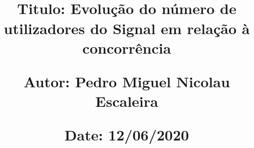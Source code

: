 \documentclass{article}
\begin{document}
\title{\vspace{-0.9cm}
       \large\raggedright\textbf{} \\ 
       \vspace{0.5cm}
       \normalsize
       \raggedright\textbf{Titulo: \hspace{1.1cm} Evolução do número de utilizadores do Signal em relação à concorrência} \\ \vspace{0.4cm}
       \raggedright\textbf{Autor: \hspace{1.13cm} Pedro Miguel Nicolau Escaleira} \\ \vspace{0.4cm}
       \raggedright\textbf{Date: \hspace{1.3cm} 12/06/2020} \\}
\author{}
\date{}

\maketitle
\thispagestyle{fancy}

\vspace{-1.4cm}

\tableofcontents

\newpage

\fontsize{10pt}{13pt}
\selectfont
\lsstyle



\end{document}
